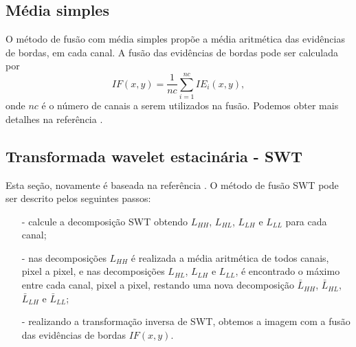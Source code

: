 \documentclass[conference]{IEEEtran}
\begin{document}
\subsection{Média simples}
O método de fusão com média simples propõe a média aritmética das evidências de bordas, em cada canal. A fusão das evidências de bordas pode ser calculada por
\begin{equation}
	IF(x,y)=\frac{1}{nc}\sum_{i=1}^{nc}IE_i(x,y),
\end{equation}
onde $nc$ é o número de canais a serem utilizados na fusão. Podemos obter mais detalhes na referência \cite{mit}.
\subsection{Transformada wavelet estacinária - SWT} Esta seção, novamente é baseada na referência \cite{n_r}. O método de fusão SWT pode ser descrito pelos seguintes passos:
\begin{itemize}
\item[-] calcule a decomposição SWT obtendo $L_{HH}$, $L_{HL}$, $L_{LH}$ e $L_{LL}$ para cada canal;
\item[-] nas decomposições $L_{HH}$ é realizada a média aritmética de todos canais, pixel a pixel, e nas decomposições $L_{HL}$, $L_{LH}$ e $L_{LL}$, é encontrado o máximo entre cada canal, pixel a pixel, restando uma nova decomposição $\bar{L}_{HH}$, $\bar{L}_{HL}$, $\bar{L}_{LH}$ e $\bar{L}_{LL}$;
\item[-] realizando a transformação inversa de SWT, obtemos a imagem com a fusão das evidências de bordas $IF(x,y)$.  
\end{itemize}
\end{document}
